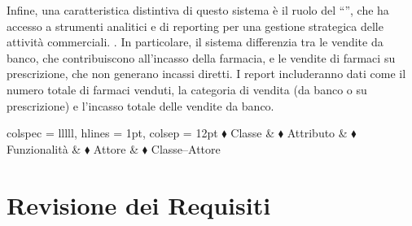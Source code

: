 \noindent Infine, una caratteristica distintiva di questo sistema è il ruolo del ``'', che ha accesso a strumenti analitici e di reporting per una gestione strategica delle attività commerciali. . In particolare, il sistema differenzia tra le vendite da banco, che contribuiscono all'incasso della farmacia, e le vendite di farmaci su prescrizione, che non generano incassi diretti. I report includeranno dati come il numero totale di farmaci venduti, la categoria di vendita (da banco o su prescrizione) e l'incasso totale delle vendite da banco.

\begin{table}[h]
	\centering
	\begin{tblr}{
		colspec = lllll,
		hlines = {1pt}, colsep = 12pt
		}
		\textcolor{ColorClass}{$\blacklozenge$} Classe &
		\textcolor{ColorAttr}{$\blacklozenge$} Attributo &
		\textcolor{ColorFunc}{$\blacklozenge$} Funzionalità &
		\textcolor{ColorActor}{$\blacklozenge$} Attore &
		\textcolor{ColorClassActor}{$\blacklozenge$} Classe--Attore \\
	\end{tblr}
\end{table}

\section{Revisione dei Requisiti}

